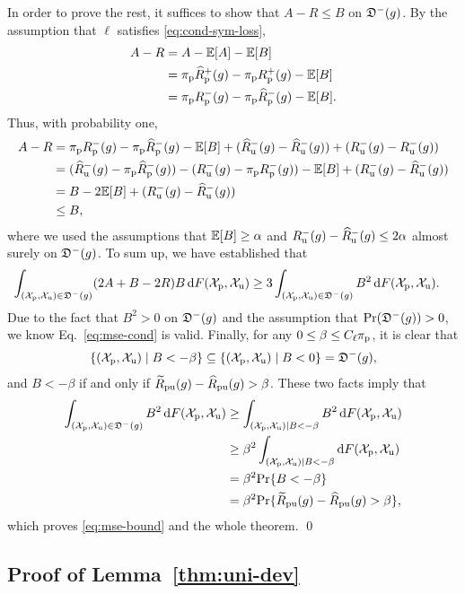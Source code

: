 In order to prove the rest, it suffices to show that $A-R\le B$ on $\fD^-(g)$. By the assumption that $\ell$ satisfies \eqref{eq:cond-sym-loss},
\begin{align*}
A-R
&= A-\bE[A]-\bE[B]\\
&= \pip\hRp^+(g)-\pip\Rp^+(g)-\bE[B]\\
&= \pip\Rp^-(g)-\pip\hRp^-(g)-\bE[B].
\end{align*}
Thus, with probability one,
\begin{align*}
A-R
&= \pip\Rp^-(g)-\pip\hRp^-(g)-\bE[B]+(\hRu^-(g)-\hRu^-(g))+(\Ru^-(g)-\Ru^-(g))\\
&= (\hRu^-(g)-\pip\hRp^-(g))-(\Ru^-(g)-\pip\Rp^-(g))-\bE[B]+(\Ru^-(g)-\hRu^-(g))\\
&= B-2\bE[B]+(\Ru^-(g)-\hRu^-(g))\\
&\le B,
\end{align*}
where we used the assumptions that $\bE[B]\ge\alpha$ and $\Ru^-(g)-\hRu^-(g)\le2\alpha$ almost surely on $\fD^-(g)$. To sum up, we have established that
\begin{align*}
\int_{(\Xp,\Xu)\in\fD^-(g)}(2A+B-2R)B\,\dif F(\Xp,\Xu)
&\ge 3\int_{(\Xp,\Xu)\in\fD^-(g)}B^2\,\dif F(\Xp,\Xu).
\end{align*}
Due to the fact that $B^2>0$ on $\fD^-(g)$ and the assumption that $\pr(\fD^-(g))>0$, we know Eq.~\eqref{eq:mse-cond} is valid. Finally, for any $0\le\beta\le C_\ell\pip$, it is clear that
\begin{align*}
\{(\Xp,\Xu)\mid B<-\beta\}
\subseteq\{(\Xp,\Xu)\mid B<0\}
=\fD^-(g),
\end{align*}
and $B<-\beta$ if and only if $\tRpu(g)-\hRpu(g)>\beta$. These two facts imply that
\begin{align*}
\int_{(\Xp,\Xu)\in\fD^-(g)}B^2\,\dif F(\Xp,\Xu)
&\ge \int_{(\Xp,\Xu) \mid B<-\beta}B^2\,\dif F(\Xp,\Xu)\\
&\ge \beta^2\int_{(\Xp,\Xu) \mid B<-\beta}\dif F(\Xp,\Xu)\\
&= \beta^2\pr\{B<-\beta\}\\
&= \beta^2\pr\{\tRpu(g)-\hRpu(g)>\beta\},
\end{align*}
which proves \eqref{eq:mse-bound} and the whole theorem. \qed

\subsection{Proof of Lemma~\ref{thm:uni-dev}}

